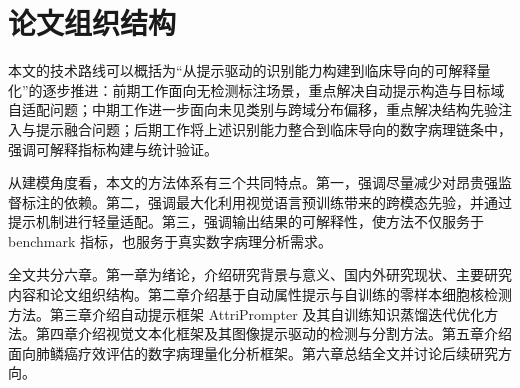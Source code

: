 \section{论文组织结构}
本文的技术路线可以概括为“从提示驱动的识别能力构建到临床导向的可解释量化”的逐步推进：前期工作面向无检测标注场景，重点解决自动提示构造与目标域自适配问题；中期工作进一步面向未见类别与跨域分布偏移，重点解决结构先验注入与提示融合问题；后期工作将上述识别能力整合到临床导向的数字病理链条中，强调可解释指标构建与统计验证。

从建模角度看，本文的方法体系有三个共同特点。第一，强调尽量减少对昂贵强监督标注的依赖。第二，强调最大化利用视觉语言预训练带来的跨模态先验，并通过提示机制进行轻量适配。第三，强调输出结果的可解释性，使方法不仅服务于 benchmark 指标，也服务于真实数字病理分析需求。

全文共分六章。第一章为绪论，介绍研究背景与意义、国内外研究现状、主要研究内容和论文组织结构。第二章介绍基于自动属性提示与自训练的零样本细胞核检测方法。第三章介绍自动提示框架 AttriPrompter 及其自训练知识蒸馏迭代优化方法。第四章介绍视觉文本化框架及其图像提示驱动的检测与分割方法。第五章介绍面向肺鳞癌疗效评估的数字病理量化分析框架。第六章总结全文并讨论后续研究方向。
